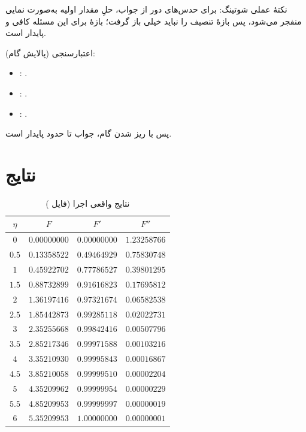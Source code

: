 \documentclass[12pt,a4paper]{article}
\begin{document}
نکتهٔ عملی شوتینگ: برای حدس‌های دور از جواب، حلِ مقدار اولیه به‌صورت
نمایی منفجر می‌شود، پس بازهٔ تنصیف را نباید خیلی باز گرفت؛ بازهٔ
\lr{$[1.0,1.5]$} برای این مسئله کافی و پایدار است.

اعتبارسنجی (پالایش گام):
\begin{itemize}
\item {}: .
\item {}: .
\item {}: .
\end{itemize}
پس با ریز شدن گام، جواب تا حدود  پایدار است.

\section{نتایج}

\begin{table}[htbp]
\centering
\caption{نتایج واقعی اجرا (فایل )}
\begin{latin}
\begin{tabular}{cccc}
\toprule
$\eta$ & $F$ & $F'$ & $F''$ \\
\midrule
$0$ & $0.00000000$ & $0.00000000$ & $1.23258766$ \\
$0.5$ & $0.13358522$ & $0.49464929$ & $0.75830748$ \\
$1$ & $0.45922702$ & $0.77786527$ & $0.39801295$ \\
$1.5$ & $0.88732899$ & $0.91616823$ & $0.17695812$ \\
$2$ & $1.36197416$ & $0.97321674$ & $0.06582538$ \\
$2.5$ & $1.85442873$ & $0.99285118$ & $0.02022731$ \\
$3$ & $2.35255668$ & $0.99842416$ & $0.00507796$ \\
$3.5$ & $2.85217346$ & $0.99971588$ & $0.00103216$ \\
$4$ & $3.35210930$ & $0.99995843$ & $0.00016867$ \\
$4.5$ & $3.85210058$ & $0.99999510$ & $0.00002204$ \\
$5$ & $4.35209962$ & $0.99999954$ & $0.00000229$ \\
$5.5$ & $4.85209953$ & $0.99999997$ & $0.00000019$ \\
$6$ & $5.35209953$ & $1.00000000$ & $0.00000001$ \\
\bottomrule
\end{tabular}
\end{latin}
\end{table}
\end{document}
